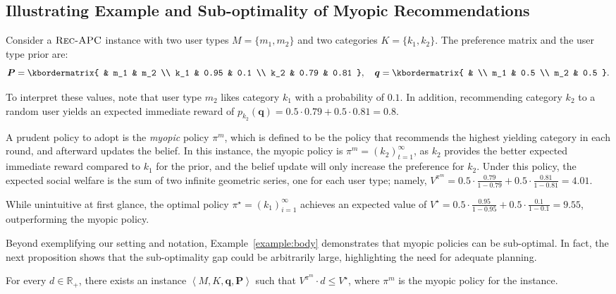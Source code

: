 \subsection{Illustrating Example and Sub-optimality of Myopic Recommendations}
\begin{example}\label{example:body}
    \normalfont
    Consider a $\textsc{Rec-APC}$ instance with two user types $M=\{m_1, m_2\}$ and two categories $K=\{k_1, k_2\}$. The preference matrix and the user type prior are:
    \renewcommand{\kbldelim}{(}%
    \renewcommand{\kbrdelim}{)}%
    \[
        \bm{P} = \kbordermatrix{
            & m_1 & m_2  \\
            k_1 & 0.95 & 0.1  \\
            k_2 & 0.79 & 0.81
        }, \quad
        \bm{q} =
        \kbordermatrix{
            &  \\
            m_1 & 0.5 \\
            m_2 & 0.5
        }.
    \]

    To interpret these values, note that user type $m_2$ likes category $k_1$ with a probability of $0.1$. In addition, recommending category $k_2$ to a random user yields an expected immediate reward of $p_{k_2}(\bm q)=0.5 \cdot 0.79 + 0.5 \cdot 0.81 = 0.8$.


    A prudent policy to adopt is the \emph{myopic} policy $\pi^m$, which is defined to be the policy that recommends the highest yielding category in each round, and afterward updates the belief. In this instance, the myopic policy is $\pi^m = \left( k_2 \right)_{t=1}^{\infty}$, as $k_2$ provides the better expected immediate reward compared to $k_1$ for the prior, and the belief update will only increase the preference for $k_2$.
    Under this policy, the expected social welfare is the sum of two infinite geometric series, one for each user type; namely, $V^{\pi^m} = 0.5\cdot \frac{0.79}{1 - 0.79} +0.5 \cdot \frac{0.81}{1 - 0.81} =4.01$.

    While unintuitive at first glance, the optimal policy $\pi^\star = \left( k_1 \right)_{i=1}^{\infty}$ achieves an expected value of $V^\star = 0.5\cdot\frac{0.95}{1-0.95} + 0.5\cdot\frac{0.1}{1-0.1} = 9.55$, outperforming the myopic policy.
\end{example}
Beyond exemplifying our setting and notation, Example~\ref{example:body} demonstrates that myopic policies can be sub-optimal. In fact, the next proposition shows that the sub-optimality gap could be arbitrarily large, highlighting the need for adequate planning.
\begin{proposition} \label{prop:myopic-policy-suboptimality}
    For every $d \in \mathbb R_+$, there exists an instance \( \left\langle M, K, \bm{q}, \bm{P} \right\rangle \) such that
    \( V^{\pi^{m}} \cdot d \leq V^{\star} \),
    where $\pi^{m}$ is the myopic policy for the instance.
\end{proposition}

